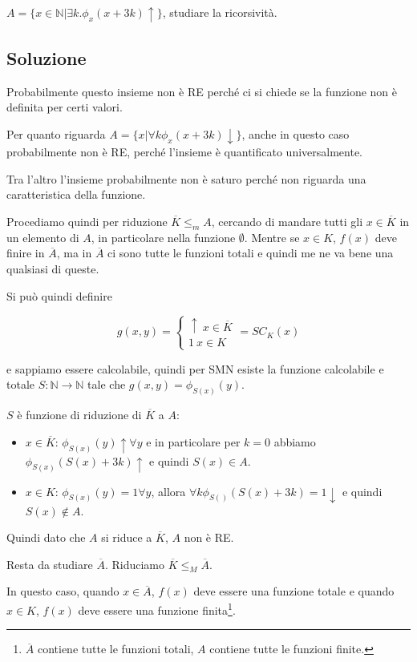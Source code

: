 $A = \{ x \in \mathbb{N} | \exists k . \phi_x(x+3k) \uparrow \}$, studiare la ricorsività.

\subsection{Soluzione}

Probabilmente questo insieme non è RE perché ci si chiede se la funzione non è definita per certi valori.

Per quanto riguarda $A = \{ x | \forall k \phi_x(x+3k)\downarrow \}$, anche in questo caso probabilmente non è RE, perché l'insieme è quantificato universalmente.

Tra l'altro l'insieme probabilmente non è saturo perché non riguarda una caratteristica della funzione.

Procediamo quindi per riduzione $\overline{K} \leq_m A$, cercando di mandare tutti gli $x \in \overline{K}$ in un elemento di $A$, in particolare nella funzione $\emptyset$. Mentre se $x \in K$, $f(x)$ deve finire in $\overline{A}$, ma in $\overline{A}$ ci sono tutte le funzioni totali e quindi me ne va bene una qualsiasi di queste.

Si può quindi definire

$$
g(x,y) = \begin{cases}
\uparrow \: x \in \overline{K} \\
1 \: x \in K
\end{cases} = SC_K(x)
$$

e sappiamo essere calcolabile, quindi per SMN esiste la funzione calcolabile e totale $S : \mathbb{N} \rightarrow \mathbb{N}$ tale che $g(x,y) = \phi_{S(x)}(y)$.

$S$ è funzione di riduzione di $\overline{K}$ a $A$:

\begin{itemize}
	\item $x \in \overline{K}$: $\phi_{S(x)} (y) \uparrow \forall y$ e in particolare per $k=0$ abbiamo $\phi_{S(x)}(S(x) + 3k)  \uparrow$ e quindi $S(x) \in A$.
	\item $x \in K$: $\phi_{S(x)}(y) = 1 \forall y $, allora $\forall k \phi_{S()}(S(x) +3k) = 1 \downarrow$ e quindi $S(x) \notin A$.
\end{itemize}

Quindi dato che $A$ si riduce a $\overline{K}$, $A$ non è RE.

Resta da studiare $\overline{A}$. Riduciamo $\overline{K} \leq_M \overline{A}$.

In questo caso, quando $x \in \overline{A}$, $f(x)$ deve essere una funzione totale e quando $x \in K$, $f(x)$ deve essere una funzione finita\footnote{$\overline{A}$ contiene tutte le funzioni totali, $A$ contiene tutte le funzioni finite.}.

